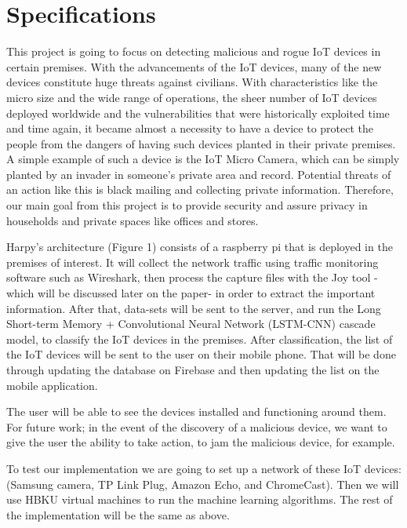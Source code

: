 \documentclass{article}
\begin{document}
\pagebreak
\justify
\section{Specifications}
\setcounter{page}{10}

This project is going to focus on detecting malicious and rogue IoT devices in certain premises. With the advancements of the IoT devices, many of the new devices constitute huge threats against civilians. With characteristics like the micro size and the wide range of operations, the sheer number of IoT devices deployed worldwide and the vulnerabilities that were historically exploited time and time again, it became almost a necessity to have a device to protect the people from the dangers of having such devices planted in their private premises. A simple example of such a device is the IoT Micro Camera, which can be simply planted by an invader in someone’s private area and record. Potential threats of an action like this is black mailing and collecting private information. Therefore, our main goal from this project is to provide security and assure privacy in households and private spaces like offices and stores. \newline

Harpy’s architecture (Figure 1) consists of a raspberry pi that is deployed in the premises of interest. It will collect the network traffic using traffic monitoring software such as Wireshark, then process the capture files with the Joy tool -which will be discussed later on the paper- in order to extract the important information. After that, data-sets will be sent to the server, and run the Long Short-term Memory + Convolutional Neural Network (LSTM-CNN) cascade model, to classify the IoT devices in the premises. After classification, the list of the IoT devices will be sent to the user on their mobile phone. That will be done through updating the database on Firebase and then updating the list on the mobile application.\pagebreak

The user will be able to see the devices installed and functioning around them. For future work; in the event of the discovery of a malicious device, we want to give the user the ability to take action, to jam the malicious device, for example.\newline

To test our implementation we are going to set up a network of these IoT devices: (Samsung camera, TP Link Plug, Amazon Echo, and ChromeCast). Then we will use HBKU virtual machines to run the machine learning algorithms. The rest of the implementation will be the same as above.\newline
\end{document}
